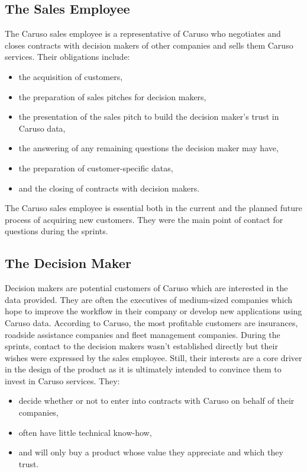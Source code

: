 \subsection{The Sales Employee}
The Caruso sales employee is a representative of Caruso who negotiates and closes contracts with decision makers of other companies and sells them Caruso services. Their obligations include:
\begin{itemize}
  \item the acquisition of customers,
  \item the preparation of sales pitches for decision makers,
  \item the presentation of the sales pitch to build the decision maker's trust in Caruso data,
  \item the answering of any remaining questions the decision maker may have,
  \item the preparation of customer-specific \glspl{data},
  \item and the closing of contracts with decision makers.
\end{itemize}
The Caruso sales employee is essential both in the current and the planned future process of acquiring new customers. They were the main point of contact for questions during the \glspl{sprint}.

\subsection{The Decision Maker}
Decision makers are potential customers of Caruso which are interested in the data provided. They are often the executives of medium-sized companies which hope to improve the workflow in their company or develop new applications using Caruso data. According to Caruso, the most profitable customers are insurances, roadside assistance companies and fleet management companies. During the \glspl{sprint}, contact to the decision makers wasn't established directly but their wishes were expressed by the sales employee. Still, their interests are a core driver in the design of the product as it is ultimately intended to convince them to invest in Caruso services. They:
\begin{itemize}
  \item decide whether or not to enter into contracts with Caruso on behalf of their companies,
  \item often have little technical know-how,
  \item and will only buy a product whose value they appreciate and which they trust.
\end{itemize}

